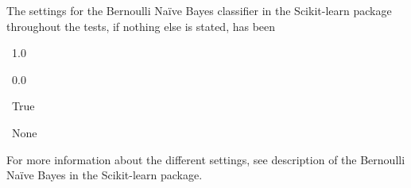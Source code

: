 The settings for the Bernoulli Naïve Bayes classifier in the Scikit-learn package throughout the tests, if nothing else is stated, has been
\begin{description}[noitemsep,labelindent=0.5cm]
\small
	\item[Alpha:] \ 1.0
	\item[Binarize:] \ 0.0
	\item[Fit prior:]\ True
	\item[Class prior:] \ None
\end{description}
For more information about the different settings, see description of the Bernoulli Naïve Bayes in the Scikit-learn package.